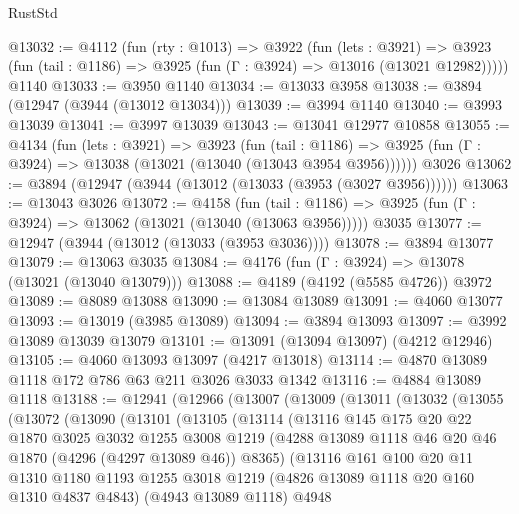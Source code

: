 \begin{lexlean}{RustStd}
\begin{coremodule}
@13032 := @4112
    (fun (rty : @1013) =>
    @3922
      (fun (lets : @3921) =>
      @3923 (fun (tail : @1186) => @3925 (fun (Γ : @3924) => @13016 (@13021 @12982)))))
    @1140
@13033 := @3950 @1140
@13034 := @13033 @3958
@13038 := @3894 (@12947 (@3944 (@13012 @13034)))
@13039 := @3994 @1140
@13040 := @3993 @13039
@13041 := @3997 @13039
@13043 := @13041 @12977 @10858
@13055 := @4134
    (fun (lets : @3921) =>
    @3923
      (fun (tail : @1186) =>
      @3925 (fun (Γ : @3924) => @13038 (@13021 (@13040 (@13043 @3954 @3956))))))
    @3026
@13062 := @3894 (@12947 (@3944 (@13012 (@13033 (@3953 (@3027 @3956))))))
@13063 := @13043 @3026
@13072 := @4158
    (fun (tail : @1186) => @3925 (fun (Γ : @3924) => @13062 (@13021 (@13040 (@13063 @3956)))))
    @3035
@13077 := @12947 (@3944 (@13012 (@13033 (@3953 @3036))))
@13078 := @3894 @13077
@13079 := @13063 @3035
@13084 := @4176 (fun (Γ : @3924) => @13078 (@13021 (@13040 @13079)))
@13088 := @4189 (@4192 (@5585 @4726)) @3972
@13089 := @8089 @13088
@13090 := @13084 @13089
@13091 := @4060 @13077
@13093 := @13019 (@3985 @13089)
@13094 := @3894 @13093
@13097 := @3992 @13089 @13039 @13079
@13101 := @13091 (@13094 @13097) (@4212 @12946)
@13105 := @4060 @13093 @13097 (@4217 @13018)
@13114 := @4870 @13089 @1118 @172 @786 @63 @211 @3026 @3033 @1342
@13116 := @4884 @13089 @1118
@13188 := @12941
    (@12966
      (@13007
        (@13009
          (@13011
            (@13032
              (@13055
                (@13072
                  (@13090
                    (@13101
                      (@13105
                        (@13114
                          (@13116
                            @145
                            @175
                            @20
                            @22
                            @1870
                            @3025
                            @3032
                            @1255
                            @3008
                            @1219
                            (@4288 @13089 @1118 @46 @20 @46 @1870 (@4296 (@4297 @13089 @46)) @8365)
                            (@13116
                              @161
                              @100
                              @20
                              @11
                              @1310
                              @1180
                              @1193
                              @1255
                              @3018
                              @1219
                              (@4826 @13089 @1118 @20 @160 @1310 @4837 @4843)
                              (@4943 @13089 @1118)
                              @4948

\end{coremodule}
\end{lexlean}
